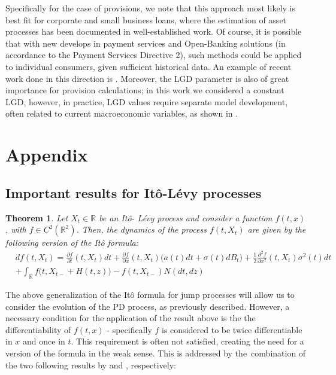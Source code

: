\documentclass[11pt,reqno]{article}
\newtheorem{theorem}{Theorem}[section]
\theoremstyle{definition}
\begin{document}
\par Specifically for the case of provisions, we note that this approach most likely is best fit for corporate and small business loans, where the estimation of asset processes has been documented in well-established work. Of course, it is possible that with new develops in payment services and Open-Banking solutions (in accordance to the Payment Services Directive 2), such methods could be applied to individual consumers, given sufficient historical data. An example of recent work done in this direction is \cite{tobback2019retail}. Moreover, the LGD parameter is also of great importance for provision calculations; in this work we considered a constant LGD, however, in practice, LGD values require separate model development, often related to current macroeconomic variables, as shown in \cite{bellotti2012loss}. 





\section{Appendix}
\subsection{Important results for It\^o-L\'evy processes}
\begin{theorem}
	Let $X_t \in \mathbb{R}$ be an It\^o- L\'evy process and consider a function $f(t,x)$, with $f \in C^{2}(\mathbb{R}^2)$. Then, the dynamics of the process $f(t,X_t)$ are given by the following version of the It\^o formula:
	\begin{align*}
	& df(t,X_t) = \frac{\partial f}{\partial t}(t,X_t)dt + \frac{\partial f}{\partial x} (t,X_t) \big(a(t) dt  +  \sigma(t) dB_t \big) + \frac{1}{2} \frac{\partial^2 f}{\partial x^2} (t,X_t) \sigma^2(t) dt \\
	& + \int_{\mathbb{R}} f\big(t,X_{t-}+ H(t,z)\big) - f(t,X_{t-}) N(dt, dz)
	\end{align*}
	\end {theorem}
	
	The above generalization of the It\^o formula for jump processes will allow us to consider the evolution of the PD process, as previously described. However, a necessary condition for the application of the result above is the the differentiability of $f(t,x)$ - specifically $f$ is considered to be twice differentiable in $x$ and once in $t$. This requirement is often not satisfied, creating the need for a version of the formula in the weak sense. This is addressed by the combination of the two following results by \cite{krylov2008controlled} and \cite{okhrati2015ito}, respectively:
	
\end{document}
